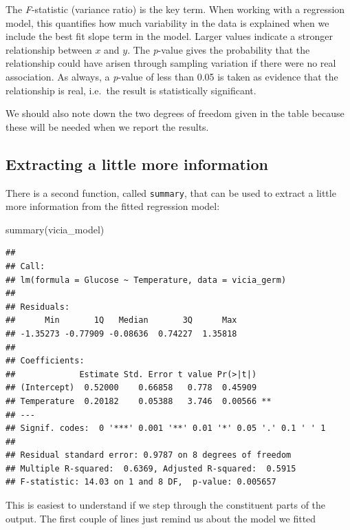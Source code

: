 \documentclass[
]{book}
\newenvironment{Shaded}{\begin{snugshade}}{\end{snugshade}}
\newcommand{\FunctionTok}[1]{\textcolor[rgb]{0.00,0.00,0.00}{#1}}
\newcommand{\NormalTok}[1]{#1}
\begin{document}
The \emph{F}-statistic (variance ratio) is the key term. When working with a regression model, this quantifies how much variability in the data is explained when we include the best fit slope term in the model. Larger values indicate a stronger relationship between \(x\) and \(y\). The \emph{p}-value gives the probability that the relationship could have arisen through sampling variation if there were no real association. As always, a \emph{p}-value of less than 0.05 is taken as evidence that the relationship is real, i.e.~the result is statistically significant.

We should also note down the two degrees of freedom given in the table because these will be needed when we report the results.

\hypertarget{extracting-a-little-more-information}{%
\subsection{Extracting a little more information}\label{extracting-a-little-more-information}}

There is a second function, called \texttt{summary}, that can be used to extract a little more information from the fitted regression model:

\begin{Shaded}
\begin{Highlighting}[]
\FunctionTok{summary}\NormalTok{(vicia\_model)}
\end{Highlighting}
\end{Shaded}

\begin{verbatim}
## 
## Call:
## lm(formula = Glucose ~ Temperature, data = vicia_germ)
## 
## Residuals:
##      Min       1Q   Median       3Q      Max 
## -1.35273 -0.77909 -0.08636  0.74227  1.35818 
## 
## Coefficients:
##             Estimate Std. Error t value Pr(>|t|)   
## (Intercept)  0.52000    0.66858   0.778  0.45909   
## Temperature  0.20182    0.05388   3.746  0.00566 **
## ---
## Signif. codes:  0 '***' 0.001 '**' 0.01 '*' 0.05 '.' 0.1 ' ' 1
## 
## Residual standard error: 0.9787 on 8 degrees of freedom
## Multiple R-squared:  0.6369, Adjusted R-squared:  0.5915 
## F-statistic: 14.03 on 1 and 8 DF,  p-value: 0.005657
\end{verbatim}

This is easiest to understand if we step through the constituent parts of the output. The first couple of lines just remind us about the model we fitted
\end{document}
